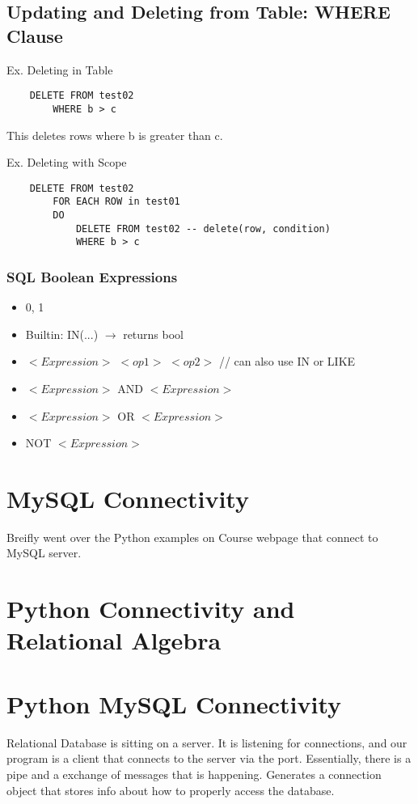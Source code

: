 \documentclass[twoside]{article}
\begin{document}
\subsection*{Updating and Deleting from Table: WHERE Clause}

Ex. Deleting in Table
\begin{verbatim}
    DELETE FROM test02
        WHERE b > c
\end{verbatim}
This deletes rows where b is greater than c.

Ex. Deleting with Scope
\begin{verbatim}
    DELETE FROM test02
        FOR EACH ROW in test01
        DO 
            DELETE FROM test02 -- delete(row, condition)
            WHERE b > c
\end{verbatim}

\subsubsection*{SQL Boolean Expressions}
\begin{itemize}
    \item 0, 1
    \item Builtin: IN(...) $\longrightarrow$ returns bool
    \item $<Expression>$ $<op1>$ $<op2>$ // can also use IN or LIKE
    \item $<Expression>$ AND $<Expression>$
    \item $<Expression>$ OR $<Expression>$
    \item NOT $<Expression>$
\end{itemize}


\section*{MySQL Connectivity}
Breifly went over the Python examples on Course webpage that connect to 
MySQL server.

\newpage
\section{Python Connectivity and Relational Algebra}

\section*{Python MySQL Connectivity}
Relational Database is sitting on a server. It is listening
for connections, and our program is a client that connects
to the server via the port. Essentially, there is a pipe and a
exchange of messages that is happening. Generates a connection object
that stores info about how to properly access the database.
\end{document}
